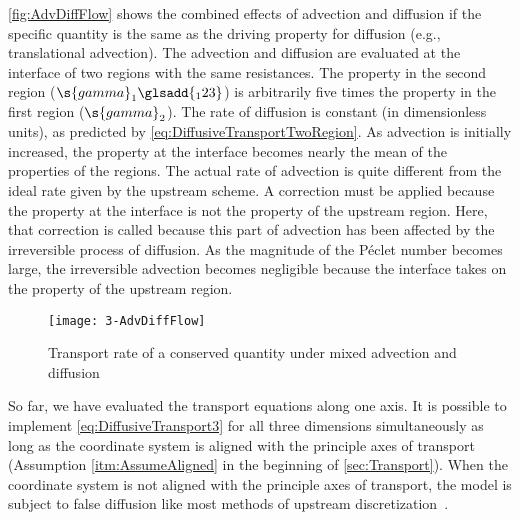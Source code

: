 \autoref{fig:AdvDiffFlow} shows the combined effects of advection and diffusion if the specific quantity is the same as the driving property for diffusion (e.g., translational advection).  The advection and diffusion are evaluated at the interface of two regions with the same resistances.  The property in the second region ($\s{gamma}_1\glsadd{_123}$) is arbitrarily five times the property in the first region ($\s{gamma}_2$).  The rate of diffusion is constant (in dimensionless units), as predicted by \autoref{eq:DiffusiveTransportTwoRegion}.  As advection is initially increased, the property at the interface becomes nearly the mean of the properties of the regions.  The actual rate of advection is quite different from the ideal rate given by the upstream scheme.  A correction must be applied because the property at the interface is not the property of the upstream region.  Here, that correction is called \emph{} because this part of advection has been affected by the irreversible process of diffusion.   As the magnitude of the P\'eclet number becomes large, the irreversible advection becomes negligible because the interface takes on the property of the upstream region.

\begin{figure}[htbp]
  \texttt{[image: 3-AdvDiffFlow]}%
  \caption{Transport rate of a conserved quantity under mixed advection and diffusion}%
  \label{fig:AdvDiffFlow}
\end{figure}

So far, we have evaluated the transport equations along one axis.  It is possible to implement \autoref{eq:DiffusiveTransport3} for all three dimensions simultaneously as long as the coordinate system is aligned with the principle axes of transport (Assumption \ref{itm:AssumeAligned} in the beginning of \autoref{sec:Transport}).   When the coordinate system is not aligned with the principle axes of transport, the model is subject to false diffusion like most methods of upstream discretization~\cite{Patankar1980}. 

